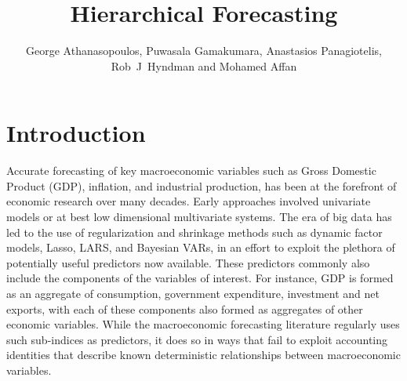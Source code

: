 \documentclass[graybox]{svmult}
\begin{document}
\title*{Hierarchical Forecasting}
\author{George Athanasopoulos, Puwasala Gamakumara, Anastasios Panagiotelis, Rob~J~Hyndman and Mohamed Affan}
%
%
\maketitle


\section{Introduction}\label{sec:intro}

Accurate forecasting of key macroeconomic variables such as Gross Domestic Product (GDP), inflation, and industrial production, has been at the forefront of economic research over many decades. Early approaches involved univariate models or at best low dimensional multivariate systems. The era of big data has led to the use of regularization and shrinkage methods such as dynamic factor models, Lasso, LARS, and Bayesian VARs, in an effort to exploit the plethora of potentially useful predictors now available. These predictors commonly also include the components of the variables of interest. For instance, GDP is formed as an aggregate of consumption, government expenditure, investment and net exports, with each of these components also formed as aggregates of other economic variables. While the macroeconomic forecasting literature regularly uses such sub-indices as predictors, it does so in ways that fail to exploit accounting identities that describe known deterministic relationships between macroeconomic variables.
\end{document}
